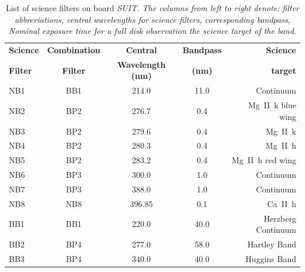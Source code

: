 \documentclass[12pt]{spieman}  %
\begin{document}
\begin{table}[ht]
\caption{List of science filters on board \it{SUIT}. The columns from left to right denote: filter abbreviations, central wavelengths for science filters, corresponding bandpass, Nominal exposure time for a full disk observation the science target of the band.} 
\label{tab:science_filters}
\begin{center}
\begin{tabular}{||l|c|c|c|r||}
\hline
\textbf{Science}  &	\textbf{Combination} &	\textbf{Central} & \textbf{Bandpass} &\textbf{Science} \\
\textbf{Filter}	&	\textbf{Filter}     &	\textbf{Wavelength  (nm)}	&		\textbf{(nm)	}	   	&\textbf{target}		\\
\hline
NB1     & BB1 		& 214.0 		    & 11.0 		& Continuum\\
NB2 	& BP2		& 276.7				& 0.4 		& Mg~\rm{II}~k blue wing \\
NB3 	& BP2		& 279.6 			& 0.4 		& Mg~\rm{II}~k\\
NB4 	& BP2		& 280.3				& 0.4 		& Mg~\rm{II}~h\\
NB5		& BP2		& 283.2				& 0.4 		& Mg~\rm{II}~h red wing\\
NB6 	& BP3		& 300.0 			&1.0 		& Continuum\\
NB7 	& BP3		& 388.0				&1.0 		& Continuum\\
NB8		& NB8		& 396.85 			& 0.1 		& Ca~\rm{II}~h\\
BB1 	& BB1		& 220.0				& 40.0 		& Herzberg Continuum \\
BB2 	& BP4		& 277.0 			& 58.0       & Hartley Band\\
BB3 	& BP4		& 340.0				& 40.0        & Huggins Band\\
\hline
\end{tabular}
\end{center}
\end{table}
\end{document}
